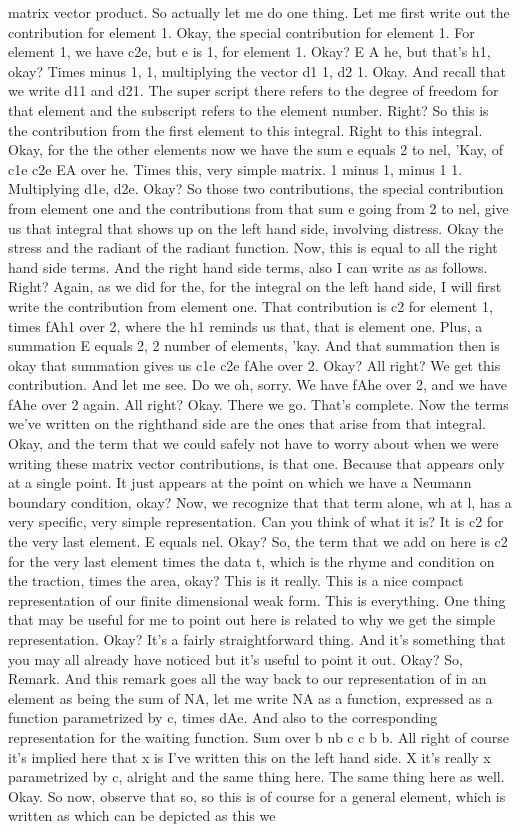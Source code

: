 \documentclass[10pt]{article}
\begin{document}
matrix vector product. So actually let me do one thing. Let me first write out the contribution for element 1. Okay, the special contribution for element 1. For element 1, we have c2e, but e is 1, for element 1. Okay? E A he, but that's h1, okay? Times minus 1, 1, multiplying the vector d1 1, d2 1. Okay. And recall that we write d11 and d21. The super script there refers to the degree of freedom for that element and the subscript refers to the element number. Right? So this is the contribution from the first element to this integral. Right to this integral. Okay, for the the other elements now we have the sum e equals 2 to nel, 'Kay, of c1e c2e EA over he. Times this, very simple matrix. 1 minus 1, minus 1 1. Multiplying d1e, d2e. Okay? So those two contributions, the special contribution from element one and the contributions from that sum e going from 2 to nel, give us that integral that shows up on the left hand side, involving distress. Okay the stress and the radiant of the radiant function. Now, this is equal to all the right hand side terms. And the right hand side terms, also I can write as as follows. Right? Again, as we did for the, for the integral on the left hand side, I will first write the contribution from element one. That contribution is c2 for element 1, times fAh1 over 2, where the h1 reminds us that, that is element one. Plus, a summation E equals 2, 2 number of elements, 'kay. And that summation then is okay that summation gives us c1e c2e fAhe over 2. Okay? All right? We get this contribution. And let me see. Do we oh, sorry. We have fAhe over 2, and we have fAhe over 2 again. All right? Okay. There we go. That's complete. Now the terms we've written on the righthand side are the ones that arise from that integral. Okay, and the term that we could safely not have to worry about when we were writing these matrix vector contributions, is that one. Because that appears only at a single point. It just appears at the point on which we have a Neumann boundary condition, okay? Now, we recognize that that term alone, wh at l, has a very specific, very simple representation. Can you think of what it is? It is c2 for the very last element. E equals nel. Okay? So, the term that we add on here is c2 for the very last element times the data t, which is the rhyme and condition on the traction, times the area, okay? This is it really. This is a nice compact representation of our finite dimensional weak form. This is everything. One thing that may be useful for me to point out here is related to why we get the simple representation. Okay? It's a fairly straightforward thing. And it's something that you may all already have noticed but it's useful to point it out. Okay? So, Remark. And this remark goes all the way back to our representation of in an element as being the sum of NA, let me write NA as a function, expressed as a function parametrized by c, times dAe. And also to the corresponding representation for the waiting function. Sum over b nb c c b b. All right of course it's implied here that x is I've written this on the left hand side. X it's really x parametrized by c, alright and the same thing here. The same thing here as well. Okay. So now, observe that so, so this is of course for a general element, which is written as which can be depicted as this we 
\end{document}
